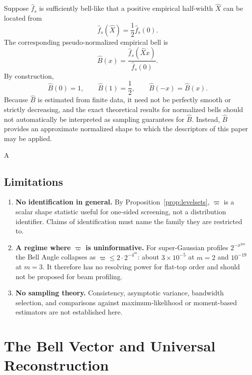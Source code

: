 \documentclass[11pt]{article}
\theoremstyle{definition}
\theoremstyle{plain}
\theoremstyle{remark}
\begin{document}
Suppose $\widehat f_s$ is sufficiently bell-like that a positive empirical half-width
$\widehat X$ can be located from
\[
\widehat f_s(\widehat X)
=
\frac12\widehat f_s(0).
\]
The corresponding pseudo-normalized empirical bell is
\[
\boxed{
\widehat B(x)
=
\frac{\widehat f_s(\widehat Xx)}
{\widehat f_s(0)}.
}
\]
By construction,
\[
\widehat B(0)=1,
\qquad
\widehat B(1)=\frac12,
\qquad
\widehat B(-x)=\widehat B(x).
\]
Because $\widehat B$ is estimated from finite data, it need not be perfectly smooth or
strictly decreasing, and the exact theoretical results for normalized bells should not
automatically be interpreted as sampling guarantees for $\widehat B$. Instead,
$\widehat B$ provides an approximate normalized shape to which the descriptors of this
paper may be applied.

A
\subsection{Limitations}

\begin{enumerate}
  \item \textbf{No identification in general.} By Proposition~\ref{prop:levelsets},
        $\varpi$ is a scalar shape statistic useful for one-sided screening, not
        a distribution identifier. Claims of identification must name the family they are
        restricted to.
  \item \textbf{A regime where $\varpi$ is uninformative.} For super-Gaussian profiles
        $2^{-x^{2m}}$ the Bell Angle collapses as $\varpi\le2\cdot2^{-4^m}$: about
        $3\times10^{-5}$ at $m=2$ and $10^{-19}$ at $m=3$. It therefore has no resolving
        power for flat-top order and should not be proposed for beam profiling.
  \item \textbf{No sampling theory.} Consistency, asymptotic variance, bandwidth
        selection, and comparisons against maximum-likelihood or moment-based estimators
        are not established here.
\end{enumerate}

 
\section{The Bell Vector and Universal Reconstruction}\label{sec:bellvector}
 
\end{document}
